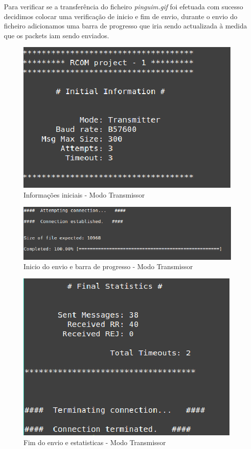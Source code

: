 \documentclass[11pt]{article}
\begin{document}
Para verificar se a transferência do ficheiro \textit{pinguim.gif} foi efetuada com sucesso decidimos colocar uma verificação de inicio e fim de envio,  durante o envio do ficheiro adicionamos uma barra de progresso que iria sendo actualizada à medida que os packets iam sendo enviados. 
\begin{figure}[h!]
\begin{center}
\includegraphics[scale=0.6]{trans1.png}
\caption{Informações iniciais - Modo Transmissor}
\label{fig:codigoFigura}
\end{center}
\end{figure}

\begin{figure}[h!]
\begin{center}
\includegraphics[scale=0.6]{trans2.png}
\caption{Inicio do envio e barra de progresso - Modo Transmissor}
\label{fig:codigoFigura}
\end{center}
\end{figure}

\begin{figure}[h!]
\begin{center}
\includegraphics[scale=0.6]{trans3.png}
\caption{Fim do envio e estatisticas - Modo Transmissor}
\label{fig:codigoFigura}
\end{center}
\end{figure}
\end{document}
